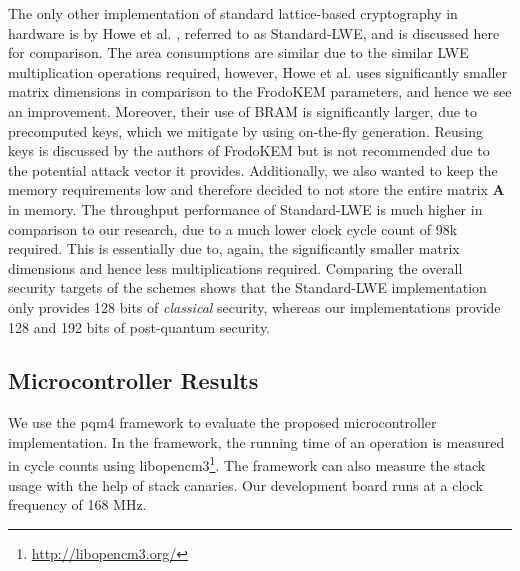 The only other implementation of standard lattice-based cryptography in hardware is by Howe et al. \cite{DBLP:conf/dac/HoweMORGB16}, referred to as \textsf{Standard-LWE}, and is discussed here for comparison. The area consumptions are similar due to the similar LWE multiplication operations required, however, Howe et al. uses significantly smaller matrix dimensions in comparison to the \textsf{FrodoKEM} parameters, and hence we see an improvement. Moreover, their use of BRAM is significantly larger, due to precomputed keys, which we mitigate by using on-the-fly generation. Reusing keys is discussed by the authors of \textsf{FrodoKEM} \cite[Sec. 5.1.4]{frodo-nist} but is not recommended due to the potential attack vector it provides. Additionally, we also wanted to keep the memory requirements low and therefore decided to not store the entire matrix $\mathbf{A}$ in memory. The throughput performance of \textsf{Standard-LWE} is much higher in comparison to our research, due to a much lower clock cycle count of 98k required. This is essentially due to, again, the significantly smaller matrix dimensions and hence less multiplications required. Comparing the overall security targets of the schemes shows that the \textsf{Standard-LWE} implementation only provides 128 bits of \textit{classical} security, whereas our implementations provide 128 and 192 bits of post-quantum security.




\subsection{Microcontroller Results}
We use the pqm4 framework \cite{pqm4} to evaluate the proposed microcontroller implementation. In the framework, the running time of an operation is measured in cycle counts using libopencm3\footnote{\url{http://libopencm3.org/}}. The framework can also measure the stack usage with the help of stack canaries. Our development board runs at a clock frequency of 168 MHz.

